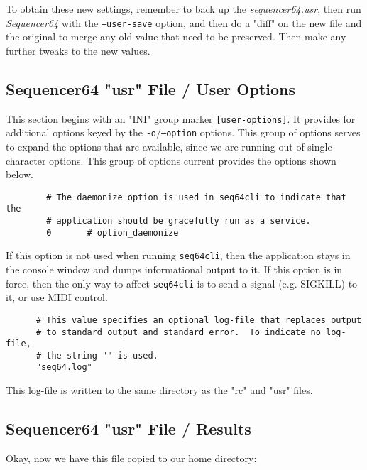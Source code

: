    To obtain these new settings, remember to back up the
   \textsl{sequencer64.usr}, then run \textsl{Sequencer64} with the
   \texttt{--user-save} option, and then do a "diff" on the new file and the
   original to merge any old value that need to be preserved.  Then make any
   further tweaks to the new values.

\subsection{Sequencer64 "usr" File / User Options}
\label{subsec:seq64_usr_file_user_options}

   This section begins with an
   "INI" group marker \texttt{[user-options]}.
   It provides for additional options keyed by the
   \texttt{-o}/\texttt{--option} options.
   This group of options serves to expand the options that are available, since
   we are running out of single-character options.
   This group of options current provides the options shown below.

   \begin{verbatim}
		# The daemonize option is used in seq64cli to indicate that the
		# application should be gracefully run as a service.
		0       # option_daemonize
   \end{verbatim}

   If this option is not used when running \texttt{seq64cli}, then the
   application stays in the console window and dumps informational output to
   it.  If this option is in force, then the only way to affect
   \texttt{seq64cli} is to send a signal (e.g. SIGKILL) to it, or use
   MIDI control.

   \begin{verbatim}
      # This value specifies an optional log-file that replaces output
      # to standard output and standard error.  To indicate no log-file,
      # the string "" is used.
      "seq64.log"
   \end{verbatim}

   This log-file is written to the same directory as the "rc" and "usr" files.

\subsection{Sequencer64 "usr" File / Results}
\label{subsec:seq64_usr_file_midi_bus_results}

   Okay, now we have this file copied to our home directory:

